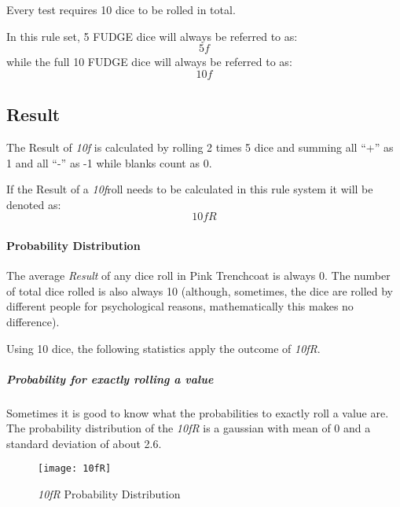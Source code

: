 Every test requires 10 dice to be rolled in total.

\hfill

In this rule set, 5 FUDGE dice will always be referred to as: \[\textit{5f}\]
while the full 10 FUDGE dice will always be referred to as: \[\textit{10f}\]

\subsection{Result}

The Result of \emph{10f} is calculated by rolling 2 times 5 dice and summing all
“+” as 1 and all “-” as -1 while blanks count as 0.

If the Result of a \emph{10f}roll needs to be calculated in this rule system it will
be denoted as: \[\textit{10fR}\]

\paragraph{Probability Distribution}

The average \emph{Result} of any dice roll in Pink Trenchcoat is always 0.
The number of total dice rolled is also always 10 (although, sometimes,
the dice are rolled by different people for psychological reasons, mathematically
this makes no difference).

Using 10 dice, the following statistics apply the outcome of \emph{10fR}.

\subparagraph{Probability for exactly rolling a value}

Sometimes it is good to know what the probabilities to exactly roll a  value are.
The probability distribution of the \emph{10fR} is a gaussian with mean of 0 and
a standard deviation of about 2.6.

\begin{figure}[htb]
    \caption{\emph{10fR} Probability Distribution}
    \texttt{[image: 10fR]}
\end{figure}

